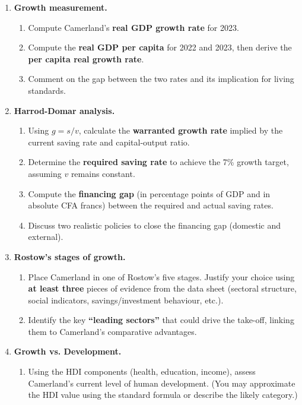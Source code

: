 \documentclass[11pt]{article}
\begin{document}
\begin{enumerate}
    \item \textbf{Growth measurement.}
          \begin{enumerate}
              \item Compute Camerland's \textbf{real GDP growth rate} for 2023.
              \item Compute the \textbf{real GDP per capita} for 2022 and 2023, then derive the \textbf{per capita real growth rate}.
              \item Comment on the gap between the two rates and its implication for living standards.
          \end{enumerate}
    \item \textbf{Harrod-Domar analysis.}
          \begin{enumerate}
              \item Using $g = s/v$, calculate the \textbf{warranted growth rate} implied by the current saving rate and capital-output ratio.
              \item Determine the \textbf{required saving rate} to achieve the 7\% growth target, assuming $v$ remains constant.
              \item Compute the \textbf{financing gap} (in percentage points of GDP and in absolute CFA francs) between the required and actual saving rates.
              \item Discuss two realistic policies to close the financing gap (domestic and external).
          \end{enumerate}
    \item \textbf{Rostow's stages of growth.}
          \begin{enumerate}
              \item Place Camerland in one of Rostow's five stages. Justify your choice using \textbf{at least three} pieces of evidence from the data sheet (sectoral structure, social indicators, savings/investment behaviour, etc.).
              \item Identify the key \textbf{``leading sectors''} that could drive the take-off, linking them to Camerland's comparative advantages.
          \end{enumerate}
    \item \textbf{Growth vs. Development.}
          \begin{enumerate}
              \item Using the HDI components (health, education, income), assess Camerland's current level of human development. (You may approximate the HDI value using the standard formula or describe the likely category.)

\end{enumerate}
\end{enumerate}
\end{document}

